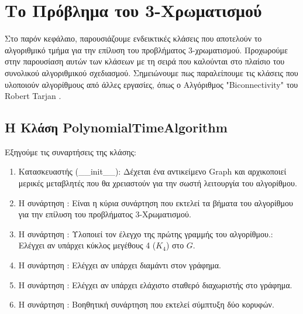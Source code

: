 \section{Το Πρόβλημα του 3-Χρωματισμού}

Στο παρόν κεφάλαιο, παρουσιάζουμε ενδεικτικές κλάσεις που αποτελούν το αλγοριθμικό τμήμα για την επίλυση του προβλήματος 3-χρωματισμού. Προχωρούμε στην παρουσίαση αυτών των κλάσεων με τη σειρά που καλούνται στο πλαίσιο του συνολικού αλγοριθμικού σχεδιασμού. Σημειώνουμε πως παραλείπουμε τις κλάσεις που υλοποιούν αλγορίθμους από άλλες εργασίες, όπως ο Αλγόριθμος "Biconnectivity" του Robert Tarjan \cite{tarjan-depth-first-search}.

\subsection{H Kλάση PolynomialTimeAlgorithm}





Εξηγούμε τις συναρτήσεις της κλάσης:

\begin{enumerate}
	\item Κατασκευαστής (\_\_init\_\_): Δέχεται ένα αντικείμενο Graph και αρχικοποιεί μερικές μεταβλητές που θα χρειαστούν για την σωστή λειτουργία του αλγορίθμου.
	
	\item H συνάρτηση : Είναι η κύρια συνάρτηση που εκτελεί τα βήματα του αλγορίθμου για την επίλυση του προβλήματος 3-Χρωματισμού.
	
	\item Η συνάρτηση : Υλοποιεί τον έλεγχο της πρώτης γραμμής του αλγορίθμου.: Ελέγχει αν υπάρχει κύκλος μεγέθους 4 ($K_4$) στο $G$.
	
	\item H συνάρτηση : Ελέγχει αν υπάρχει διαμάντι στον γράφημα.    
	
	\item H συνάρτηση :  Ελέγχει αν υπάρχει ελάχιστο σταθερό διαχωριστής στο γράφημα.
	
	\item H συνάρτηση :  Βοηθητική συνάρτηση που εκτελεί σύμπτυξη δύο κορυφών.
\end{enumerate}

